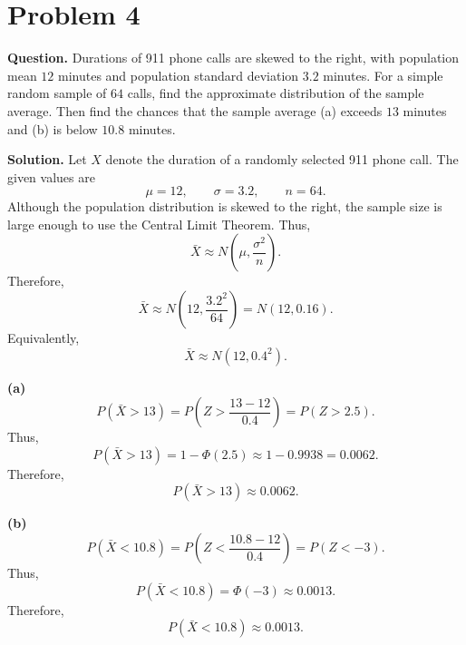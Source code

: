 \documentclass[11pt]{article}
\begin{document}
\section*{Problem 4}

\textbf{Question.} Durations of 911 phone calls are skewed to the right, with population mean $12$ minutes and population standard deviation $3.2$ minutes. For a simple random sample of $64$ calls, find the approximate distribution of the sample average. Then find the chances that the sample average (a) exceeds $13$ minutes and (b) is below $10.8$ minutes.

\textbf{Solution.} Let $X$ denote the duration of a randomly selected 911 phone call. The given values are
\[
\mu=12, \qquad \sigma=3.2, \qquad n=64.
\]
Although the population distribution is skewed to the right, the sample size is large enough to use the Central Limit Theorem. Thus,
\[
\bar X\approx N\left(\mu,\frac{\sigma^2}{n}\right).
\]
Therefore,
\[
\bar X\approx N\left(12,\frac{3.2^2}{64}\right)=N(12,0.16).
\]
Equivalently,
\[
\boxed{\bar X\approx N(12,0.4^2)}.
\]

\textbf{(a)}
\[
P(\bar X>13)=P\left(Z>\frac{13-12}{0.4}\right)=P(Z>2.5).
\]
Thus,
\[
P(\bar X>13)=1-\Phi(2.5)\approx 1-0.9938=0.0062.
\]
Therefore,
\[
\boxed{P(\bar X>13)\approx 0.0062}.
\]

\textbf{(b)}
\[
P(\bar X<10.8)=P\left(Z<\frac{10.8-12}{0.4}\right)=P(Z<-3).
\]
Thus,
\[
P(\bar X<10.8)=\Phi(-3)\approx 0.0013.
\]
Therefore,
\[
\boxed{P(\bar X<10.8)\approx 0.0013}.
\]

\newpage
\end{document}
